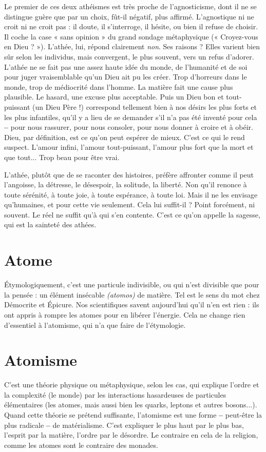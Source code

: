 Le premier de ces deux athéismes est très proche de l’agnosticisme, dont il
ne se distingue guère que par un choix, fût-il négatif, plus affirmé. L’agnostique
ni ne croit ni ne croit pas : il doute, il s’interroge, il hésite, ou bien il refuse de
choisir. Il coche la case « sans opinion » du grand sondage métaphysique
(« Croyez-vous en Dieu ? »). L’athée, lui, répond clairement {\it non}. Ses raisons ?
Elles varient bien sûr selon les individus, mais convergent, le plus souvent, vers
un refus d’adorer. L’athée ne se fait pas une assez haute idée du monde, de
l'humanité et de soi pour juger vraisemblable qu’un Dieu ait pu les créer. Trop
d’horreurs dans le monde, trop de médiocrité dans l’homme. La matière fait
une cause plus plausible. Le hasard, une excuse plus acceptable. Puis un Dieu
bon et tout-puissant (un Dieu Père !) correspond tellement bien à nos désirs les
plus forts et les plus infantiles, qu’il y a lieu de se demander s’il n’a pas été
inventé pour cela {\bf --} pour nous rassurer, pour nous consoler, pour nous donner
à croire et à obéir. Dieu, par définition, est ce qu’on peut espérer de mieux.
C’est ce qui le rend suspect. L'amour infini, l'amour tout-puissant, l'amour
plus fort que la mort et que tout... Trop beau pour être vrai.

L’athée, plutôt que de se raconter des histoires, préfère affronter comme il
peut l’angoisse, la détresse, le désespoir, la solitude, la liberté. Non qu'il
renonce à toute sérénité, à toute joie, à toute espérance, à toute loi. Mais il ne
les envisage qu’humaines, et pour cette vie seulement. Cela lui suffit-il ? Point
forcément, ni souvent. Le réel ne suffit qu’à qui s’en contente. C’est ce qu’on
appelle la sagesse, qui est la sainteté des athées.

\section{Atome}
Étymologiquement, c’est une particule indivisible, ou qui n’est divisible
que pour la pensée : un élément insécable {\it (atomos)} de matière.
Tel est le sens du mot chez Démocrite et Épicure. Nos scientifiques savent
aujourd’hui qu’il n’en est rien : ils ont appris à rompre les atomes pour en
libérer l'énergie. Cela ne change rien d’essentiel à l’atomisme, qui n’a que faire
de l’étymologie.

\section{Atomisme}
C'est une théorie physique ou métaphysique, selon les cas, qui
explique l’ordre et la complexité (le monde) par les interactions
hasardeuses de particules élémentaires (les atomes, mais aussi bien les quarks, leptons
et autres bosons...). Quand cette théorie se prétend suffisante, l’atomisme
est une forme {\bf --} peut-être la plus radicale {\bf --} de matérialisme. C’est expliquer le
plus haut par le plus bas, l'esprit par la matière, l’ordre par le désordre. Le
contraire en cela de la religion, comme les atomes sont le contraire des monades.

